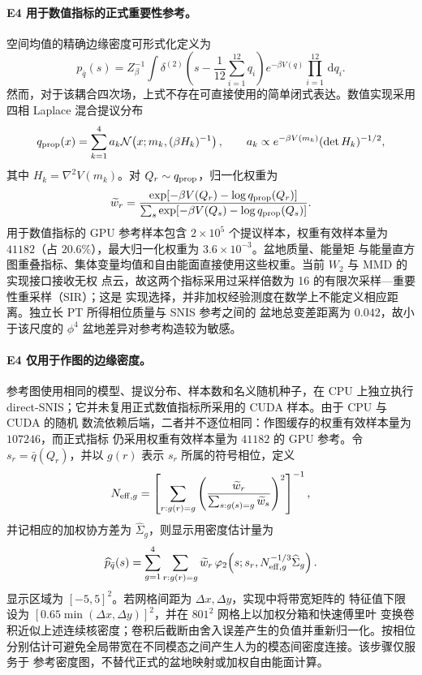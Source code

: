 \documentclass[11pt,a4paper]{article}
\newcommand{\dd}{\,\mathrm{d}}
\begin{document}
\paragraph{E4 用于数值指标的正式重要性参考。}
空间均值的精确边缘密度可形式化定义为
\begin{equation}
 p_{\bar q}(s)
 =Z_\beta^{-1}\int
 \delta^{(2)}\!\left(s-\frac1{12}\sum_{i=1}^{12}q_i\right)
 e^{-\beta V(q)}\prod_{i=1}^{12}\dd q_i .
\end{equation}
然而，对于该耦合四次场，上式不存在可直接使用的简单闭式表达。数值实现采用四相
Laplace 混合提议分布
\begin{equation}
 q_{\rm prop}(x)=\sum_{k=1}^{4}a_k
 \mathcal N\!\left(x;m_k,(\beta H_k)^{-1}\right),\qquad
 a_k\propto e^{-\beta V(m_k)}(\det H_k)^{-1/2},
\end{equation}
其中 $H_k=\nabla^2V(m_k)$。对 $Q_r\sim q_{\rm prop}$，归一化权重为
\begin{equation}
 \widetilde w_r=
 \frac{\exp[-\beta V(Q_r)-\log q_{\rm prop}(Q_r)]}
 {\sum_s\exp[-\beta V(Q_s)-\log q_{\rm prop}(Q_s)]}.
\end{equation}
用于数值指标的 GPU 参考样本包含 $2\times10^5$ 个提议样本，权重有效样本量为
$41182$（占 $20.6\%$），最大归一化权重为 $3.6\times10^{-3}$。盆地质量、能量矩
与能量直方图重叠指标、集体变量均值和自由能面直接使用这些权重。当前 $W_2$ 与
MMD 的实现接口接收无权
点云，故这两个指标采用过采样倍数为 16 的有限次采样—重要性重采样（SIR）；这是
实现选择，并非加权经验测度在数学上不能定义相应距离。独立长 PT 所得相位质量与
SNIS 参考之间的
盆地总变差距离为 $0.042$，故小于该尺度的 $\phi^4$ 盆地差异对参考构造较为敏感。

\paragraph{E4 仅用于作图的边缘密度。}
参考图使用相同的模型、提议分布、样本数和名义随机种子，在 CPU 上独立执行
direct-SNIS；它并未复用正式数值指标所采用的 CUDA 样本。由于 CPU 与 CUDA 的随机
数流依赖后端，二者并不逐位相同：作图缓存的权重有效样本量为 $107246$，而正式指标
仍采用权重有效样本量为 $41182$ 的 GPU 参考。令
$s_r=\bar q(Q_r)$，并以 $g(r)$ 表示 $s_r$ 所属的符号相位，定义
\begin{equation}
 N_{{\rm eff},g}
 =\left[\sum_{r:g(r)=g}
 \left(\frac{\widetilde w_r}{\sum_{s:g(s)=g}\widetilde w_s}\right)^2
 \right]^{-1},
\end{equation}
并记相应的加权协方差为 $\widehat\Sigma_g$，则显示用密度估计量为
\begin{equation}
 \widehat p_{\bar q}(s)
 =\sum_{g=1}^{4}\sum_{r:g(r)=g}
 \widetilde w_r\,
 \varphi_2\!\left(s;s_r,
 N_{{\rm eff},g}^{-1/3}\widehat\Sigma_g\right).
\end{equation}
显示区域为 $[-5,5]^2$。若网格间距为 $\Delta x,\Delta y$，实现中将带宽矩阵的
特征值下限设为
\([0.65\min(\Delta x,\Delta y)]^2\)，并在 $801^2$ 网格上以加权分箱和快速傅里叶
变换卷积近似上述连续核密度；卷积后截断由舍入误差产生的负值并重新归一化。按相位
分别估计可避免全局带宽在不同模态之间产生人为的模态间密度连接。该步骤仅服务于
参考密度图，不替代正式的盆地映射或加权自由能面计算。
\end{document}

